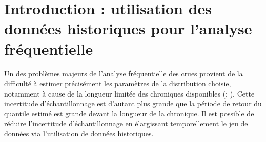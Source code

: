 \FloatBarrier


\newpage

\section{Introduction : utilisation des données historiques pour l'analyse fréquentielle}

	\paragraph{} Un des problèmes majeurs de l'analyse fréquentielle des crues provient de la difficulté à estimer précisément les paramètres de la distribution choisie, notamment à cause de la longueur limitée des chroniques disponibles (\cite{kjeldsen_uncertainty_2011}; \cite{apel_flood_2004}). Cette incertitude d'échantillonnage est d'autant plus grande que la période de retour du quantile estimé est grande devant la longueur de la chronique. Il est possible de réduire l'incertitude d'échantillonnage en élargissant temporellement le jeu de données via l'utilisation de données historiques.
	 
